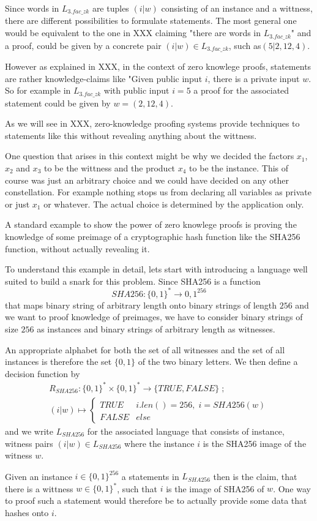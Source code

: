 \begin{example}[3-factorization]
Since words in $L_{3.fac\_zk}$ are tuples $(i|w)$ consisting of an instance and a wittness, there are different possibilities to formulate statements. The most general one would be equivalent to the one in XXX claiming "there are words in $L_{3.fac\_zk}$" and a proof, could be given by a concrete pair $(i|w)\in L_{3.fac\_zk}$, such as$(5|2,12,4)$. 

However as explained in XXX, in the context of zero knowlege proofs, statements are rather knowledge-claims like "Given public input $i$, there is a private input $w$. So for example in $L_{3.fac\_zk}$ with public input $i=5$ a proof for the associated statement could be given by $w=(2,12,4)$.

As we will see in XXX, zero-knowledge proofing systems provide techniques to statements like this without revealing anything about the wittness.

One question that arises in this context might be why we decided the factors $x_1$, $x_2$ and $x_3$ to be the wittness and the product $x_4$ to be the instance. This of course was just an arbitrary choice and we could have decided on any other constellation. For example nothing stops us from declaring all variables as private or just $x_1$ or whatever. The actual choice is determined by the application only.
\end{example}
\begin{example} A standard example to show the power of zero knowlege proofs is proving the knowledge of some preimage of a cryptographic hash function like the SHA256 function, without actually revealing it. 

To understand this example in detail, lets start with introducing a language well suited to build a snark for this problem. Since SHA256 is a function
$$
SHA256: \{0,1\}^* \to {0,1}^{256}
$$
that maps binary string of arbitrary length onto binary strings of length $256$ and we want to proof knowledge of preimages, we have to consider binary strings of size $256$ as instances and binary strings of arbitrary length as witnesses. 

An appropriate alphabet for both the set of all witnesses and the set of all instances is therefore the set $\{0,1\}$ of the two binary letters. We then define a decision function by
\begin{multline*}
R_{SHA256} : \{0,1\}^* \times \{0,1\}^* \to \{TRUE, FALSE\}\;;\;\\
(i|w) \mapsto
\begin{cases}
TRUE & i.len()=256,\; i = SHA256(w)\\
FALSE & else
\end{cases}
\end{multline*}
and we write $L_{SHA256}$ for the associated language that consists of instance, witness pairs $(i|w)\in L_{SHA256}$ where the instance $i$ is the SHA256 image of the witness $w$. 

Given an instance $i\in \{0,1\}^{256}$ a statements in $L_{SHA256}$ then is the claim, that there is a wittness $w\in \{0,1\}^{*}$, such that $i$ is the image of SHA256 of $w$. One way to proof such a statement would therefore be to actually provide some data that hashes onto $i$. 
\end{example}
